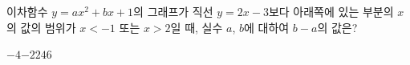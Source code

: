 이차함수 $y=ax^2+bx+1$의 그래프가 직선 $y=2x-3$보다 아래쪽에 있는 부분의 $x$의 값의 범위가 $x<-1$ 또는 $x>2$일 때, 실수 $a$, $b$에 대하여 $b-a$의 값은?
\begin{choices32}{$-4$}{$-2$}{$2$}{$4$}{$6$}\end{choices32}
